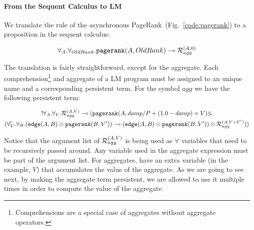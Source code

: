 \paragraph{From the Sequent Calculus to LM}

\newcommand{\agg}[2]{\mathcal{R}_{#1}^{(#2)}}

We translate the rule of the asynchronous PageRank~(Fig.~\ref{code:pagerank}) to
a proposition in the sequent calculus:

{\stuffsize
\begin{align}
   \forall_A. \forall_{OldRank}. \mathtt{pagerank}(A, OldRank) \multimap
   \mathcal{R}_{agg}^{(A, 0)}
\end{align}
}

The translation is fairly straightforward, except for the aggregate. Each
comprehension\footnote{Comprehensions are a special case of aggregates without
aggregate operators.} and aggregate of a LM program must be assigned to an
unique name and a corresponding persistent term. For the symbol $agg$ we have
the following persistent term:

{\stuffsize
\begin{multline}
   {!} \forall_A. \forall_V. \mathcal{R}_{agg}^{(A, V)} \multimap (\mathtt{pagerank}(A,
   damp/P + (1.0 - damp) \times V) \mathbin{\binampersand} \\ (\forall_V'. \forall_B.
   (\mathtt{edge}(A, B) \otimes \mathtt{pagerank}(B, V')) \multimap
   (\mathtt{edge}(A, B) \otimes \mathtt{pagerank}(B, V')) \otimes \mathcal{R}_{agg}^{(A, V
   + V')}))
\end{multline}
}

Notice that the argument list of $\mathcal{R}_{agg}^{(A, V)}$ is being used as
$\forall$ variables that need to be recursively passed around. Any variable used
in the aggregate expression must be part of the argument list.  For aggregates,
have an extra variable (in the example, $V$) that accumulates the value of the
aggregate. As we are going to see next, by making the aggregate term persistent,
we are allowed to use it multiple times in order to compute the value of the
aggregate.
